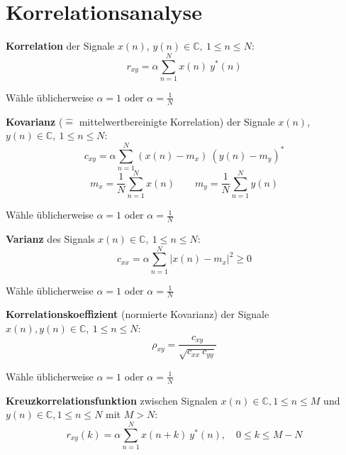 \documentclass[10pt,a4paper]{article}
\begin{document}
\section*{Korrelationsanalyse}
\vspace{-1.5em}
\begin{multicols}{2}
	\begin{adjustbox}{valign=t,center=0.45\textwidth,margin=1ex,minipage=[t][][t]{0.43\textwidth},bgcolor=white,cfbox=black 1.5pt 0pt 1pt}
		\textbf{Korrelation} der Signale $x(n)$, $y(n) \in \mathbb C, ~ 1 \leq n \leq N$:
		\[ r_{xy} = \alpha \sum_{n = 1}^N x(n) ~ y^*(n) \]

		Wähle üblicherweise $\alpha = 1$ oder $\alpha = \frac{1}{N}$
	\end{adjustbox}

	\begin{adjustbox}{valign=t,center=0.45\textwidth,margin=1ex,minipage=[t][][t]{0.43\textwidth},bgcolor=white,cfbox=black 1.5pt 0pt 1pt}
		\textbf{Kovarianz} ($\hat =$ mittelwertbereinigte Korrelation) der Signale $x(n)$, $y(n) \in \mathbb C, ~ 1 \leq n \leq N$:
		\[ c_{xy} = \alpha \sum_{n = 1}^N (x(n) - m_x) ~ (y(n) - m_y)^* \]
		\[ m_x = \frac{1}{N} \sum_{n = 1}^N x(n) \qquad m_y = \frac{1}{N} \sum_{n = 1}^N y(n) \]

		Wähle üblicherweise $\alpha = 1$ oder $\alpha = \frac{1}{N}$
	\end{adjustbox}

	\begin{adjustbox}{valign=t,center=0.45\textwidth,margin=1ex,minipage=[t][][t]{0.43\textwidth},bgcolor=white,cfbox=black 1.5pt 0pt 1pt}
		\textbf{Varianz} des Signals $x(n) \in \mathbb C, ~ 1 \leq n \leq N$:
		\[ c_{xx} = \alpha \sum_{n = 1}^N \left| x(n) - m_x \right|^2 \geq 0 \]

		Wähle üblicherweise $\alpha = 1$ oder $\alpha = \frac{1}{N}$
	\end{adjustbox}

	\begin{adjustbox}{valign=t,center=0.45\textwidth,margin=1ex,minipage=[t][][t]{0.43\textwidth},bgcolor=white,cfbox=black 1.5pt 0pt 1pt}
		\textbf{Korrelationskoeffizient} (normierte Kovarianz) der Signale $x(n), y(n) \in \mathbb C, ~ 1 \leq n \leq N$:
		\[ \rho_{xy} = \frac{c_{xy}}{\sqrt{c_{xx} ~ c_{yy}}} \]

		Wähle üblicherweise $\alpha = 1$ oder $\alpha = \frac{1}{N}$
	\end{adjustbox}

	\begin{adjustbox}{valign=t,center=0.45\textwidth,margin=1ex,minipage=[t][][t]{0.43\textwidth},bgcolor=white,cfbox=black 1.5pt 0pt 1pt}
		\textbf{Kreuzkorrelationsfunktion} zwischen Signalen $x(n) \in \mathbb C, 1 \leq n \leq M$ und $y(n) \in \mathbb C, 1 \leq n \leq N$ mit $M > N$:
		\[ r_{xy}(k) = \alpha \sum_{n = 1}^N x(n + k) ~ y^*(n), \quad 0 \leq k \leq M - N \]


\end{adjustbox}
\end{multicols}
\end{document}
